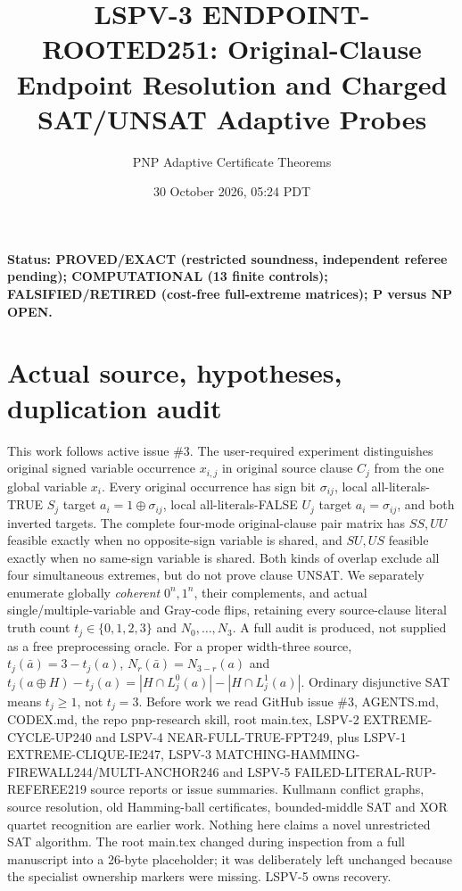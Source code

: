 \documentclass[11pt]{article}
\title{LSPV-3 ENDPOINT-ROOTED251: Original-Clause Endpoint Resolution and Charged SAT/UNSAT Adaptive Probes}
\author{PNP Adaptive Certificate Theorems}
\date{30 October 2026, 05:24 PDT}
\begin{document}
\maketitle
\noindent\textbf{Status: PROVED/EXACT (restricted soundness, independent referee pending); COMPUTATIONAL (13 finite controls); FALSIFIED/RETIRED (cost-free full-extreme matrices); P versus NP OPEN.}
\section{Actual source, hypotheses, duplication audit}
This work follows active issue \#3. The user-required experiment distinguishes original signed variable occurrence $x_{i,j}$ in original source clause $C_j$ from the one global variable $x_i$. Every original occurrence has sign bit $\sigma_{ij}$, local all-literals-TRUE $S_j$ target $a_i=1\oplus\sigma_{ij}$, local all-literals-FALSE $U_j$ target $a_i=\sigma_{ij}$, and both inverted targets. The complete four-mode original-clause pair matrix has $SS,UU$ feasible exactly when no opposite-sign variable is shared, and $SU,US$ feasible exactly when no same-sign variable is shared. Both kinds of overlap exclude all four simultaneous extremes, but do not prove clause UNSAT. We separately enumerate globally \emph{coherent} $0^n,1^n$, their complements, and actual single/multiple-variable and Gray-code flips, retaining every source-clause literal truth count $t_j\in\{0,1,2,3\}$ and $N_0,\ldots,N_3$. A full audit is produced, not supplied as a free preprocessing oracle.
For a proper width-three source, $t_j(\bar a)=3-t_j(a)$, $N_r(\bar a)=N_{3-r}(a)$ and $t_j(a\oplus H)-t_j(a)=|H\cap L^0_j(a)|-|H\cap L^1_j(a)|$. Ordinary disjunctive SAT means $t_j\ge1$, not $t_j=3$.
Before work we read GitHub issue \#3, AGENTS.md, CODEX.md, the repo pnp-research skill, root main.tex, LSPV-2 EXTREME-CYCLE-UP240 and LSPV-4 NEAR-FULL-TRUE-FPT249, plus LSPV-1 EXTREME-CLIQUE-IE247, LSPV-3 MATCHING-HAMMING-FIREWALL244/MULTI-ANCHOR246 and LSPV-5 FAILED-LITERAL-RUP-REFEREE219 source reports or issue summaries. Kullmann conflict graphs, source resolution, old Hamming-ball certificates, bounded-middle SAT and XOR quartet recognition are earlier work. Nothing here claims a novel unrestricted SAT algorithm. The root main.tex changed during inspection from a full manuscript into a 26-byte placeholder; it was deliberately left unchanged because the specialist ownership markers were missing. LSPV-5 owns recovery.
\end{document}
